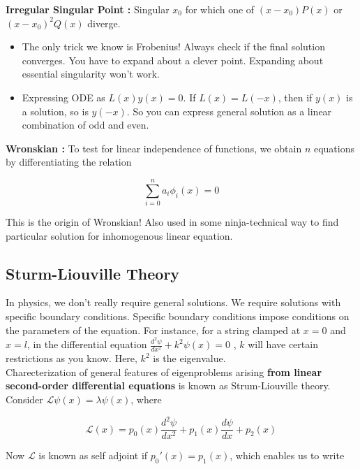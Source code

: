 \documentclass{report}
\begin{document}
\noindent \textbf{Irregular Singular Point :} Singular $x_0$ for which one of $(x-x_0)P(x)$ or $(x-x_0)^2 Q(x)$ diverge.\\

\begin{itemize}
  \item The only trick we know is Frobenius! Always check if the final solution converges. You have to expand about a clever point. Expanding about essential singularity won't work.\\

  \item Expressing ODE as $L(x)y(x) = 0$. If $L(x) = L(-x)$, then if $y(x)$ is a solution, so is $y(-x)$. So you can express general solution as a linear combination of odd and even.
\end{itemize}

\noindent \textbf{Wronskian :} To test for linear independence of functions, we obtain $n$ equations by differentiating the relation 

$$\sum_{i=0}^{n}a_i \phi_i (x) = 0$$

\noindent This is the origin of Wronskian! Also used in some ninja-technical way to find particular solution for inhomogenous linear equation.

\subsection{Sturm-Liouville Theory}

In physics, we don't really require general solutions. We require solutions with specific boundary conditions. Specific boundary conditions impose conditions on the parameters of the equation. For instance, for a string clamped at $x=0$ and $x=l$, in the differential equation $\frac{d^2\psi}{dx^2} + k^2\psi(x) = 0$ , $k$ will have certain restrictions as you know. Here, $k^2$ is the eigenvalue.\\

\noindent Charecterization of general features of eigenproblems arising \textbf{from linear second-order differential equations} is known as Strum-Liouville theory.\\

\noindent Consider $\mathcal{L}\psi(x) = \lambda\psi(x)$, where

$$\mathcal{L}(x) = p_0(x)\frac{d^2 \psi}{dx^2} + p_1(x)\frac{d\psi}{dx} + p_2(x)$$

\noindent Now $\mathcal{L}$ is known as self adjoint if $p_0'(x) = p_1(x)$, which enables us to write 
\end{document}
